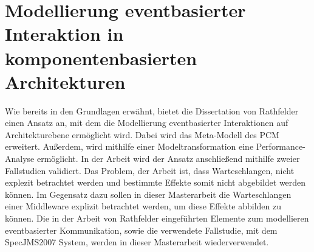 \section{Modellierung eventbasierter Interaktion in komponentenbasierten Architekturen}
Wie bereits in den Grundlagen erwähnt, bietet die Dissertation von Rathfelder \cite{Rathfelder2013} einen Ansatz an, mit dem die Modellierung eventbasierter Interaktionen auf Architekturebene ermöglicht wird. Dabei wird das Meta-Modell des PCM erweitert. Außerdem, wird mithilfe einer Modeltransformation eine Performance-Analyse ermöglicht. In der Arbeit wird der Ansatz anschließend mithilfe zweier Fallstudien validiert. Das Problem, der Arbeit ist, dass Warteschlangen, nicht explezit betrachtet werden und bestimmte Effekte somit nicht abgebildet werden können. Im Gegensatz dazu sollen in dieser Masterarbeit die Warteschlangen einer Middleware explizit betrachtet werden, um diese Effekte abbilden zu können. Die in der Arbeit von Rathfelder eingeführten Elemente zum modellieren eventbasierter Kommunikation, sowie die verwendete Fallstudie, mit dem SpecJMS2007 System, werden in dieser Masterarbeit wiederverwendet.